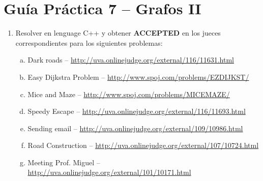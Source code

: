 




\section*{Gu\'ia Pr\'actica 7 -- Grafos II}

\begin{enumerate}[1 -]
	
	\item Resolver en lenguage C++ y obtener \textbf{ACCEPTED} en los jueces correspondientes para los siguientes problemas:
	
	\begin{enumerate}[a)]

		\item Dark roads -- \href{http://uva.onlinejudge.org/external/116/11631.html}{http://uva.onlinejudge.org/external/116/11631.html}
		\item Easy Dijkstra Problem -- \href{http://www.spoj.com/problems/EZDIJKST/}{http://www.spoj.com/problems/EZDIJKST/}
		\item Mice and Maze -- \href{http://www.spoj.com/problems/MICEMAZE/}{http://www.spoj.com/problems/MICEMAZE/}
		\item Speedy Escape -- \href{http://uva.onlinejudge.org/external/116/11693.html}{http://uva.onlinejudge.org/external/116/11693.html}
		\item Sending email -- \href{http://uva.onlinejudge.org/external/109/10986.html}{http://uva.onlinejudge.org/external/109/10986.html}
		\item Road Construction -- \href{http://uva.onlinejudge.org/external/107/10724.html}{http://uva.onlinejudge.org/external/107/10724.html}
		\item Meeting Prof. Miguel -- \href{http://uva.onlinejudge.org/external/101/10171.html}{http://uva.onlinejudge.org/external/101/10171.html}
	\end{enumerate}
\end{enumerate}

